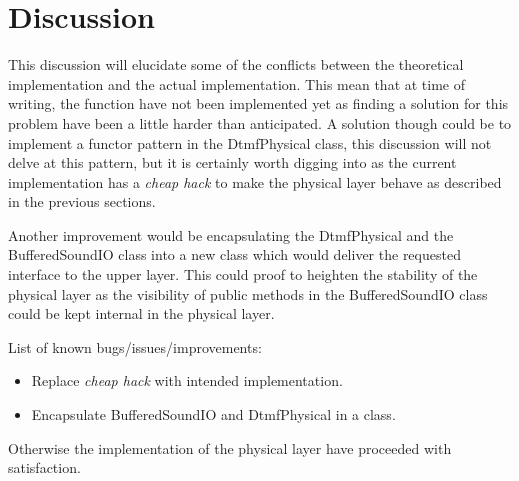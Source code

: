 \section{Discussion}
This discussion will elucidate some of the conflicts between the theoretical implementation and the actual implementation. This mean that at time of writing, the  function have not been implemented yet as finding a solution for this problem have been a little harder than anticipated. A solution though could be to implement a functor pattern in the DtmfPhysical class, this discussion will not delve at this pattern, but it is certainly worth digging into as the current implementation has a \textit{cheap hack} to make the physical layer behave as described in the previous sections.

Another improvement would be encapsulating the DtmfPhysical and the BufferedSoundIO class into a new class which would deliver the requested interface to the upper layer. This could proof to heighten the stability of the physical layer as the visibility of public methods in the BufferedSoundIO class could be kept internal in the physical layer.

List of known bugs/issues/improvements:
\begin{itemize}
\item Replace \textit{cheap hack} with intended implementation.
\item Encapsulate BufferedSoundIO and DtmfPhysical in a class.
\end{itemize}

Otherwise the implementation of the physical layer have proceeded with satisfaction.